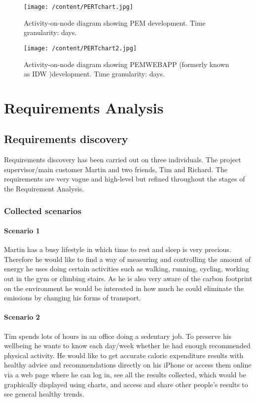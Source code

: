 \documentclass[12pt, a4paper]{report}   %
\begin{document}
\begin{enumerate}
\begin{figure}[H]
  \centering
	\texttt{[image: /content/PERTchart.jpg]}
	  \caption{Activity-on-node diagram showing PEM development. Time granularity: days.}
\end{figure}

\begin{figure}[H]
  \centering
	\texttt{[image: /content/PERTchart2.jpg]}
	  \caption{Activity-on-node diagram showing PEMWEBAPP (formerly known as IDW )development. Time granularity: days.}
\end{figure}


\chapter{Requirements Analysis}

\section{Requirements discovery}
Requirements discovery has been carried out on three individuals. The project supervisor/main customer Martin and two friends, Tim and Richard. The requirements are very vague and high-level but refined throughout the stages of the Requirement Analysis.

\subsection{Collected scenarios}
\subsubsection*{Scenario 1}
Martin has a busy lifestyle in which time to rest and sleep is very precious. Therefore he would like to find a way of measuring and controlling the amount of energy he uses doing certain activities such as walking, running, cycling, working out in the gym or climbing stairs. As he is also very aware of the carbon footprint on the environment he would be interested in how much he could eliminate the emissions by changing his forms of transport.

\subsubsection*{Scenario 2}
Tim spends lots of hours in an office doing a sedentary job. To preserve his wellbeing he wants to know each day/week whether he had enough recommended physical activity. He would like to get accurate caloric expenditure results with healthy advice and recommendations directly on his iPhone or access them online via a web page where he can log in, see all the results collected, which would be graphically displayed using charts, and access and share other people's results to see general healthy trends.



\end{enumerate}
\end{document}
